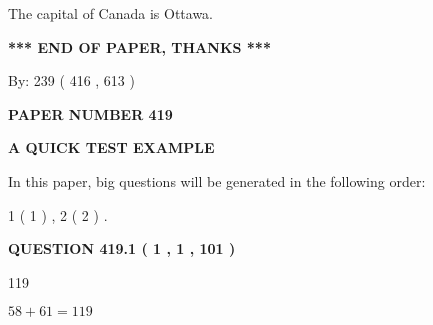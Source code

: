 \documentclass[12pt]{article}
\begin{document}
  
 
 
\noindent{}
 
 
The capital of Canada is Ottawa.
 
 
 
 
   
   
 \vspace{0.2in}
 
   
   
   
   
\vspace{1.0in} 
{\textbf{\large{ *** END OF PAPER, THANKS *** }}} 
   
   
\hspace{1.0in} By: 
 239 ( 416 ,  613 )
   
   
   
   
\newpage 
\setcounter{page}{ 
   419001 } 
   
   
   
   
 {\textbf{ \Large{ PAPER NUMBER  419  }}}
   
   
\vspace{0.2in}
   
   
   
   
   
   
 \vspace{0.2in}
{\LARGE {\textbf{ A QUICK TEST EXAMPLE}}}
   
   
   
\vspace{0.2in}
   
In this paper, big questions will be generated in the following order: 
   
   
   1 ( 1 )
 ,
   2 ( 2 )
 .
  
\vspace{0.2in}
  
{\textbf{\Large{QUESTION
419.1 
 ( 1 , 1 , 101 )
}}}
  
  
 
 
\noindent{}

119
 
 
 
 
\noindent{}

$ %
58 +  %
61=   %
119$
 
\end{document}
